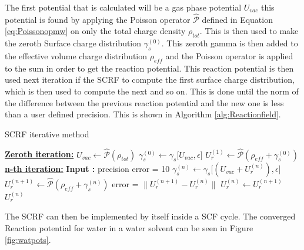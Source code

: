 \documentclass[../master_thesis.tex]{subfiles}
\begin{document}
The first potential that is calculated will be a gas phase potential $U_{vac}$ this
potential is found by applying the Poisson operator $\hat{\mathscr{P}}$ defined
in Equation \ref{eq:Poissonopmw} on only the total charge density $\rho_{tot}$.
This is then used to make the zeroth Surface charge distribution $\gamma_s^{(0)}$.
This zeroth gamma is then added to the effective volume charge distribution $\rho_{eff}$
and the Poisson operator is applied to the sum in order to get the reaction potential.
This reaction potential is then used next iteration if the \ac{SCRF} to compute
the first surface charge distribution, which is then used to compute the next
and so on. This is done until the norm of the difference between the previous
reaction potential and the new one is less than a user defined precision. This is shown in
Algorithm \ref{alg:Reactionfield}.
\begin{algorithm}
  \caption{\ac{SCRF} iterative method}\label{alg:Reactionfield}
  \begin{algorithmic}
    \STATE \underline{\textbf{Zeroth iteration:}}
    \STATE $U_{vac} \leftarrow \hat{\mathscr{P}}(\rho_{tot})$
    \STATE $\gamma_s^{(0)} \leftarrow \gamma_s\big[U_{vac}, \epsilon\big]$
    \STATE $U_r^{(1)} \leftarrow \hat{\mathscr{P}}(\rho_{eff} + \gamma_s^{(0)})$
    \STATE \underline{\textbf{n-th iteration:}}
    \STATE \textbf{Input :} precision
    \STATE error = 10
      \STATE $\gamma_s^{(n)} \leftarrow \gamma_s\big[(U_{vac}+ U_r^{(n)}), \epsilon\big]$
      \STATE $U_r^{(n+1)} \leftarrow \hat{\mathscr{P}} (\rho_{eff} + \gamma_s^{(n)})$
      \STATE error = $\lVert U_r^{(n+1)} - U_r^{(n)} \rVert$
      \STATE $U_r^{(n)} \leftarrow U_r^{(n+1)}$
    \ENDWHILE
    \RETURN $U_r^{(n)}$
  \end{algorithmic}
\end{algorithm}
The \ac{SCRF} can then be implemented by itself inside a \ac{SCF} cycle.
The converged Reaction potential for water in a water solvent can be seen in
Figure \ref{fig:watpots}.
\end{document}
